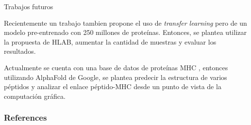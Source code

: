 \documentclass[10pt]{beamer}
\newcommand{\1}{
	\setbeamertemplate{background}{
		\texttt{[image: img/1]}
		\tikz[overlay] \fill[fill opacity=0.75,fill=white] (0,0) rectangle (-\paperwidth,\paperheight);
	}
}
\begin{document}

\begin{frame}{Trabajos futuros}{}
	\begin{block}{}
		Recientemente un trabajo \cite{hashemi2022improved} tambien propone el uso de \textit{transfer learning} pero de un modelo pre-entrenado con 250 millones de proteínas. Entonces, se plantea utilizar la propuesta de HLAB, aumentar la cantidad de muestras y evaluar los resultados.
	\end{block}
	
	\begin{block}{}
		Actualmente se cuenta con una base de datos de proteínas MHC \cite{e2019phla3d}, entonces utilizando AlphaFold de Google, se plantea predecir la estructura de varios péptidos y analizar el enlace péptido-MHC desde un punto de vista de la computación gráfica.	
	\end{block}
	
	
\end{frame}

\begin{frame}
	\frametitle{References}
	
	
\end{frame}
\end{document}
